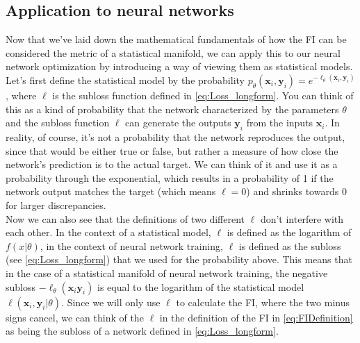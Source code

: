 \subsection{Application to neural networks}
Now that we've laid down the mathematical fundamentals of how the FI can be considered the metric of a statistical manifold, we can apply this to our neural network optimization by introducing a way of viewing them as statistical models.\\
Let's first define the statistical model by the probability $p_\theta(\mathbf{x}_i,\mathbf{y}_i) = e^{-\ell_\theta(\mathbf{x}_i,\mathbf{y}_i)}$, where $\ell$ is the subloss function defined in \cref{eq:Loss_longform}. You can think of this as a kind of probability that the network characterized by the parameters $\theta$ and the subloss function $\ell$ can generate the outputs $\mathbf{y}_i$ from the inputs $\mathbf{x}_i$. In reality, of course, it's not a probability that the network reproduces the output, since that would be either true or false, but rather a measure of how close the network's prediction is to the actual target. We can think of it and use it as a probability through the exponential, which results in a probability of 1 if the network output matches the target (which means $\ell = 0$) and shrinks towards 0 for larger discrepancies.\\
Now we can also see that the definitions of two different $\ell$ don't interfere with each other. In the context of a statistical model, $\ell$ is defined as the logarithm of $f(x|\theta)$, in the context of neural network training, $\ell$ is defined as the subloss (see \cref{eq:Loss_longform}) that we used for the probability above. This means that in the case of a statistical manifold of neural network training, the negative subloss $-\ell_\theta(\mathbf{x}_i \mathbf{y}_i)$ is equal to the logarithm of the statistical model $\ell(\mathbf{x}_i, \mathbf{y}_i|\theta)$. Since we will only use $\ell$ to calculate the FI, where the two minus signs cancel, we can think of the $\ell$ in the definition of the FI in \cref{eq:FIDefinition} as being the subloss of a network defined in \cref{eq:Loss_longform}.